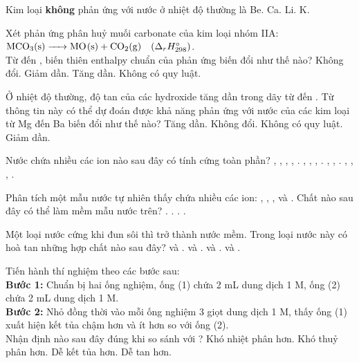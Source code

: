 \documentclass[11pt,a4paper]{article}
\def\loigiai#1{}
\begin{document}
\begin{ex}
Kim loại \textbf{không} phản ứng với nước ở nhiệt độ thường là
\choice
{Be.}
{Ca.}
{Li.}
{K.}
\loigiai{}
\end{ex}

\begin{ex}
Xét phản ứng phân huỷ muối carbonate của kim loại nhóm IIA: $\ce{MCO3(s) -> MO(s) + CO2(g)} \quad (\Delta_r H^\circ_{298})$.\\
Từ  đến , biến thiên enthalpy chuẩn của phản ứng biến đổi như thế nào?
\choice
{Không đổi.}
{Giảm dần.}
{Tăng dần.}
{Không có quy luật.}
\loigiai{}
\end{ex}

\begin{ex}
Ở nhiệt độ thường, độ tan của các hydroxide tăng dần trong dãy từ  đến . Từ thông tin này có thể dự đoán được khả năng phản ứng với nước của các kim loại từ Mg đến Ba biến đổi như thế nào?
\choice
{Tăng dần.}
{Không đổi.}
{Không có quy luật.}
{Giảm dần.}
\loigiai{}
\end{ex}

\begin{ex}
Nước chứa nhiều các ion nào sau đây có tính cứng toàn phần?
\choice
{, , , , .}
{, , , .}
{, , .}
{, , , .}
\loigiai{}
\end{ex}

\begin{ex}
Phân tích một mẫu nước tự nhiên thấy chứa nhiều các ion: , , ,  và . Chất nào sau đây có thể làm mềm mẫu nước trên?
\choice
{.}
{.}
{.}
{.}
\loigiai{}
\end{ex}

\begin{ex}
Một loại nước cứng khi đun sôi thì trở thành nước mềm. Trong loại nước này có hoà tan những hợp chất nào sau đây?
\choice
{ và .}
{ và .}
{ và .}
{ và .}
\loigiai{}
\end{ex}

\begin{ex}
Tiến hành thí nghiệm theo các bước sau:\\
\textbf{Bước 1:} Chuẩn bị hai ống nghiệm, ống (1) chứa 2 mL dung dịch  1 M, ống (2) chứa 2 mL dung dịch  1 M.\\
\textbf{Bước 2:} Nhỏ đồng thời vào mỗi ống nghiệm 3 giọt dung dịch  1 M, thấy ống (1) xuất hiện kết tủa chậm hơn và ít hơn so với ống (2).\\
Nhận định nào sau đây đúng khi so sánh  với ?
\choice
{Khó nhiệt phân hơn.}
{Khó thuỷ phân hơn.}
{Dễ kết tủa hơn.}
{Dễ tan hơn.}
\loigiai{}
\end{ex}
\end{document}

